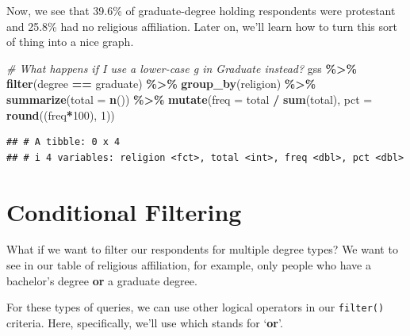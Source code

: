\documentclass[
]{book}
\newenvironment{Shaded}{\begin{snugshade}}{\end{snugshade}}
\newcommand{\AttributeTok}[1]{\textcolor[rgb]{0.13,0.29,0.53}{#1}}
\newcommand{\CommentTok}[1]{\textcolor[rgb]{0.56,0.35,0.01}{\textit{#1}}}
\newcommand{\DecValTok}[1]{\textcolor[rgb]{0.00,0.00,0.81}{#1}}
\newcommand{\FunctionTok}[1]{\textcolor[rgb]{0.13,0.29,0.53}{\textbf{#1}}}
\newcommand{\NormalTok}[1]{#1}
\newcommand{\SpecialCharTok}[1]{\textcolor[rgb]{0.81,0.36,0.00}{\textbf{#1}}}
\newcommand{\StringTok}[1]{\textcolor[rgb]{0.31,0.60,0.02}{#1}}
\begin{document}
Now, we see that 39.6\% of graduate-degree holding respondents were protestant and 25.8\% had no religious affiliation. Later on, we'll learn how to turn this sort of thing into a nice graph.

\begin{Shaded}
\begin{Highlighting}[]
\CommentTok{\# What happens if I use a lower{-}case \textquotesingle{}g\textquotesingle{} in \textquotesingle{}Graduate\textquotesingle{} instead?}
\NormalTok{gss }\SpecialCharTok{\%\textgreater{}\%}
  \FunctionTok{filter}\NormalTok{(degree }\SpecialCharTok{==} \StringTok{\textquotesingle{}graduate\textquotesingle{}}\NormalTok{) }\SpecialCharTok{\%\textgreater{}\%}
  \FunctionTok{group\_by}\NormalTok{(religion) }\SpecialCharTok{\%\textgreater{}\%}
  \FunctionTok{summarize}\NormalTok{(}\AttributeTok{total =} \FunctionTok{n}\NormalTok{()) }\SpecialCharTok{\%\textgreater{}\%}
  \FunctionTok{mutate}\NormalTok{(}\AttributeTok{freq =}\NormalTok{ total }\SpecialCharTok{/} \FunctionTok{sum}\NormalTok{(total),}
         \AttributeTok{pct =} \FunctionTok{round}\NormalTok{((freq}\SpecialCharTok{*}\DecValTok{100}\NormalTok{), }\DecValTok{1}\NormalTok{))}
\end{Highlighting}
\end{Shaded}

\begin{verbatim}
## # A tibble: 0 x 4
## # i 4 variables: religion <fct>, total <int>, freq <dbl>, pct <dbl>
\end{verbatim}

\hypertarget{conditional-filtering}{%
\section{Conditional Filtering}\label{conditional-filtering}}

What if we want to filter our respondents for multiple degree types? We want to see in our table of religious affiliation, for example, only people who have a bachelor's degree \textbf{or} a graduate degree.

For these types of queries, we can use other logical operators in our \texttt{filter()} criteria. Here, specifically, we'll use \texttt{\textbar{}} which stands for `\textbf{or}'.
\end{document}
